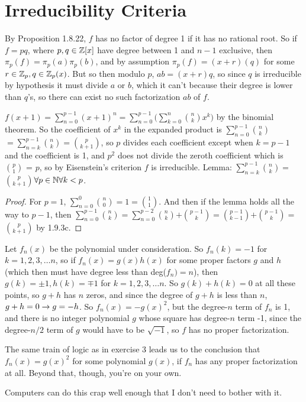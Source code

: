 \documentclass[11pt, oneside]{article}   	%
\begin{document}
\section{Irreducibility Criteria}
\be
\item By Proposition 1.8.22, $f$ has no factor of degree 1 if it has no rational root. So if $f=pq$, where $p, q \in \mathbb{Z}[x]$ have degree between 1 and $n-1$ exclusive, then $\pi_p(f) = \pi_p(a)\pi_p(b)$, and by assumption $\pi_p(f) = (x+r)(q)$ for some $r \in \mathbb{Z}_p, q \in \mathbb{Z}_p(x)$. But so then modulo $p$, $ab = (x+r)q$, so since $q$ is irreducible by hypothesis it must divide $a$ or $b$, which it can't because their degree is lower than $q$'s, so there can exist no such factorization $ab$ of $f$.
\item $f(x+1) = \sum_{n=0}^{p-1}(x+1)^n = \sum_{n=0}^{p-1}(\sum_{k=0}^n$$n\choose k$$x^k)$ by the binomial theorem. So the coefficient of $x^k$ in the expanded product is $\sum_{n=0}^{p-1}$$n\choose k$$ = \sum_{n=k}^{p-1}$$n\choose k$$ = $$p \choose {k+1}$, so $p$ divides each coefficient except when $k=p-1$ and the coefficient is 1, and $p^2$ does not divide the zeroth coefficient which is $p \choose 1$ = $p$, so by Eisenstein's criterion $f$ is irreducible.
Lemma: $\sum_{n=k}^{p-1}$$n\choose k$$ = $$p \choose {k+1}$$ \forall p \in \mathbb{N} \forall k < p$. \begin{proof}
For $p=1$, $\sum_{n=0}^0 $$n \choose 0$$ = 1 = $$1 \choose 1$. And then if the lemma holds all the way to $p-1$, then $\sum_{n=0}^{p-1}$$n\choose k$$ = \sum_{n=0}^{p-2}$$n \choose k$$ + $$p-1 \choose k$$ = $$p-1 \choose k-1$$ + $$p-1 \choose k$$ = $$p \choose k+1$ by 1.9.3c.
\end{proof}
\item Let $f_n(x)$ be the polynomial under consideration. So $f_n(k) = -1$ for $k = 1, 2, 3, \ldots n$, so if $f_n(x) = g(x)h(x)$ for some proper factors $g$ and $h$ (which then must have degree less than deg($f_n) = n$), then $g(k) = \pm 1, h(k) = \mp 1$ for $k = 1, 2, 3, \ldots n$. So $g(k) + h(k) = 0$ at all these points, so $g+h$ has $n$ zeros, and since the degree of $g + h$ is less than $n$, $g + h = 0 \rightarrow g = -h$. So $f_n(x) = -g(x)^2$, but the degree-$n$ term of $f_n$ is 1, and there is no integer polynomial $g$ whose square has degree-$n$ term -1, since the degree-$n/2$ term of $g$ would have to be $\sqrt{-1}$, so $f$ has no proper factorization.
\item The same train of logic as in exercise 3 leads us to the conclusion that $f_n(x) = g(x)^2$ for some polynomial $g(x)$, if $f_n$ has any proper factorization at all. Beyond that, though, you're on your own.
\item Computers can do this crap well enough that I don't need to bother with it.
\ee 
\end{document}
